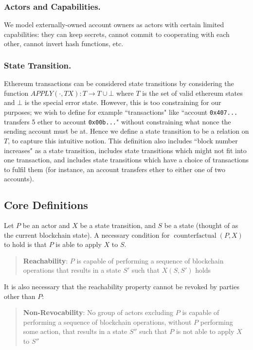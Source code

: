 \documentclass[prb,floatfix,reprint,nofootinbib,amsmath,amssymb,epsfig,pre,floats,letterpaper,groupedaffiliation,tightenlines,allcolors=blue,11pt]{revtex4}
\theoremstyle{definition}
\theoremstyle{definition}
\theoremstyle{definition}
\DeclareMathOperator{\counterfactual}{counterfactual}
\begin{document}
\begin{appendix}
\subsubsection{Actors and Capabilities.} We model externally-owned account owners as actors with certain limited capabilities: they can keep secrets, cannot commit to cooperating with each other, cannot invert hash functions, etc.

\subsubsection{State Transition.} Ethereum transactions can be considered state transitions by considering the function $APPLY(\cdot, TX) : T \to T \cup \bot$ where $T$ is the set of valid ethereum states and $\bot$ is the special error state. However, this is too constraining for our purposes; we wish to define for example ``transactions" like ``account \texttt{0x407...} transfers 5 ether to account \texttt{0x00b...}" without constraining what nonce the sending account must be at. Hence we define a state transition to be a relation on $T$, to capture this intuitive notion. This definition also includes ``block number increases" as a state transition, includes state transitions which might not fit into one transaction, and includes state transitions which have a choice of transactions to fulfil them (for instance, an account transfers ether to either one of two accounts).

\subsection{Core Definitions}

Let $P$ be an actor and $X$ be a state transition, and $S$ be a state (thought of as the current blockchain state). A necessary condition for $\counterfactual(P, X)$ to hold is that $P$ is able to apply $X$ to $S$.

\begin{quote}
\textbf{Reachability}: $P$ is capable of performing a sequence of blockchain operations that results in a state $S'$ such that $X(S, S')$ holds
\end{quote}

It is also necessary that the reachability property cannot be revoked by parties other than $P$:

\begin{quote}
\textbf{Non-Revocability}: No group of actors excluding $P$ is capable of performing a sequence of blockchain operations, without $P$ performing some action, that results in a state $S''$ such that $P$ is not able to apply $X$ to $S''$
\end{quote}


\end{appendix}
\end{document}
